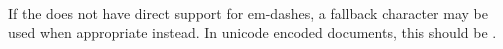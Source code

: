  \\

If the  does not have direct support for em-dashes, a fallback character may be used when appropriate instead. In unicode encoded documents, this should be . \\

\begin{examples}
\end{examples}

